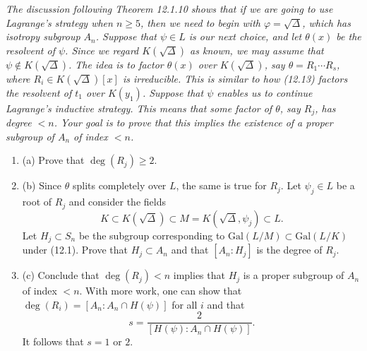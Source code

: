 \documentclass[11pt,a4paper]{article}
\newcommand{\be} {\begin{enumerate}}
\newcommand{\ee} {\end{enumerate}}
\newcommand{\Gal}{\mathrm{Gal}}
\begin{document}
{\it The discussion following Theorem 12.1.10 shows that if we are going to use Lagrange's strategy when $n\geq 5$, then we need to begin with $\varphi = \sqrt{\Delta}$, which has isotropy subgroup $A_n$. Suppose that $\psi \in L$ is our next choice, and let $\theta(x)$ be the resolvent of $\psi$. Since we regard $K(\sqrt{\Delta})$ as known, we may assume that $\psi \not \in K(\sqrt{\Delta})$. The idea is to factor $\theta(x)$ over $K(\sqrt{\Delta})$, say $\theta = R_1\cdots R_s$, where $R_i \in K(\sqrt{\Delta})[x]$ is irreducible. This is similar to how (12.13) factors the resolvent of $t_1$ over $K(y_1)$. Suppose that $\psi$ enables us to continue Lagrange's inductive strategy. This means that some factor of $\theta$, say $R_j$, has degree $<n$. Your goal is to prove that this implies the existence of a proper subgroup of $A_n$ of index $<n$.
\be
\item[(a)] Prove that $\deg(R_j) \geq 2$.
\item[(b)] Since $\theta$ splits completely over $L$, the same is true for $R_j$. Let $\psi_j \in L$ be a root of $R_j$ and consider the fields
$$K \subset K(\sqrt{\Delta}) \subset M = K(\sqrt{\Delta},\psi_j) \subset L.$$
Let $H_j \subset S_n$ be the subgroup corresponding to $\Gal(L/M) \subset \Gal(L/K)$ under (12.1). Prove that $H_j \subset A_n$ and that $[A_n:H_j]$ is the degree of $R_j$.
\item[(c)] Conclude that $\deg(R_j)<n$ implies that $H_j$ is a proper subgroup of $A_n$ of index $<n$. With more work, one can show that $\deg(R_i) = [A_n:A_n\cap H(\psi)]$ for all $i$ and that
$$s = \frac{2}{[H(\psi):A_n \cap H(\psi)]}.$$
It follows that $s = 1$ or $2$.
\ee
}
\end{document}
